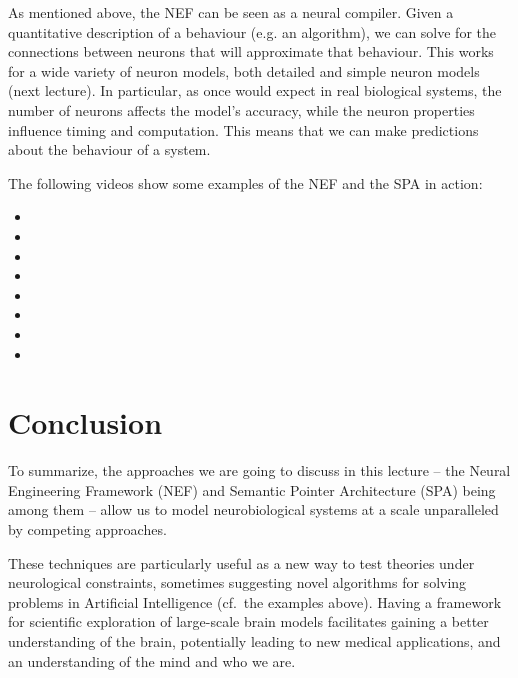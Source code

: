 \documentclass[10pt,letterpaper,oneside]{article}
\begin{document}
As mentioned above, the NEF can be seen as a neural compiler. Given a quantitative description of a behaviour (e.g. an algorithm), we can solve for the connections between neurons that will approximate that behaviour. This works for a wide variety of neuron models, both detailed and simple neuron models (next lecture). In particular, as once would expect in real biological systems, the number of neurons affects the model's accuracy, while the neuron properties influence timing and computation. This means that we can make predictions about the behaviour of a system.

The following videos show some examples of the NEF and the SPA in action:
\begin{multicols}{2}
	\begin{itemize}
		\setlength{\itemsep}{0cm}
		\item {}
		\item {}
		\item {}
		\item {}
		\item {}
		\item {}
		\item {}
		\item {}
	\end{itemize}
\end{multicols}

\section{Conclusion}

To summarize, the approaches we are going to discuss in this lecture -- the Neural Engineering Framework (NEF) and Semantic Pointer Architecture (SPA) being among them -- allow us to model neurobiological systems at a scale unparalleled by competing approaches.

These techniques are particularly useful as a new way to test theories under neurological constraints, sometimes suggesting novel algorithms for solving problems in Artificial Intelligence (cf.~the examples above). Having a framework for scientific exploration of large-scale brain models facilitates gaining a better understanding of the brain, potentially leading to new medical applications, and an understanding of the mind and who we are.

\printbibliography
\end{document}
